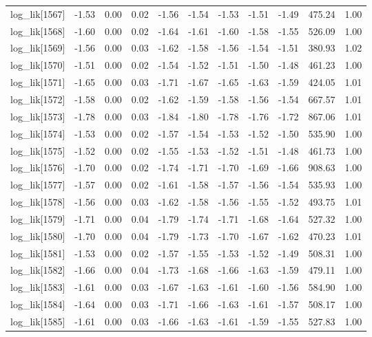 \begin{table}[ht]
\begin{tabular}{rrrrrrrrrrr}
  log\_lik[1567] & -1.53 & 0.00 & 0.02 & -1.56 & -1.54 & -1.53 & -1.51 & -1.49 & 475.24 & 1.00 \\ 
  log\_lik[1568] & -1.60 & 0.00 & 0.02 & -1.64 & -1.61 & -1.60 & -1.58 & -1.55 & 526.09 & 1.00 \\ 
  log\_lik[1569] & -1.56 & 0.00 & 0.03 & -1.62 & -1.58 & -1.56 & -1.54 & -1.51 & 380.93 & 1.02 \\ 
  log\_lik[1570] & -1.51 & 0.00 & 0.02 & -1.54 & -1.52 & -1.51 & -1.50 & -1.48 & 461.23 & 1.00 \\ 
  log\_lik[1571] & -1.65 & 0.00 & 0.03 & -1.71 & -1.67 & -1.65 & -1.63 & -1.59 & 424.05 & 1.01 \\ 
  log\_lik[1572] & -1.58 & 0.00 & 0.02 & -1.62 & -1.59 & -1.58 & -1.56 & -1.54 & 667.57 & 1.01 \\ 
  log\_lik[1573] & -1.78 & 0.00 & 0.03 & -1.84 & -1.80 & -1.78 & -1.76 & -1.72 & 867.06 & 1.01 \\ 
  log\_lik[1574] & -1.53 & 0.00 & 0.02 & -1.57 & -1.54 & -1.53 & -1.52 & -1.50 & 535.90 & 1.00 \\ 
  log\_lik[1575] & -1.52 & 0.00 & 0.02 & -1.55 & -1.53 & -1.52 & -1.51 & -1.48 & 461.73 & 1.00 \\ 
  log\_lik[1576] & -1.70 & 0.00 & 0.02 & -1.74 & -1.71 & -1.70 & -1.69 & -1.66 & 908.63 & 1.00 \\ 
  log\_lik[1577] & -1.57 & 0.00 & 0.02 & -1.61 & -1.58 & -1.57 & -1.56 & -1.54 & 535.93 & 1.00 \\ 
  log\_lik[1578] & -1.56 & 0.00 & 0.03 & -1.62 & -1.58 & -1.56 & -1.55 & -1.52 & 493.75 & 1.01 \\ 
  log\_lik[1579] & -1.71 & 0.00 & 0.04 & -1.79 & -1.74 & -1.71 & -1.68 & -1.64 & 527.32 & 1.00 \\ 
  log\_lik[1580] & -1.70 & 0.00 & 0.04 & -1.79 & -1.73 & -1.70 & -1.67 & -1.62 & 470.23 & 1.01 \\ 
  log\_lik[1581] & -1.53 & 0.00 & 0.02 & -1.57 & -1.55 & -1.53 & -1.52 & -1.49 & 508.31 & 1.00 \\ 
  log\_lik[1582] & -1.66 & 0.00 & 0.04 & -1.73 & -1.68 & -1.66 & -1.63 & -1.59 & 479.11 & 1.00 \\ 
  log\_lik[1583] & -1.61 & 0.00 & 0.03 & -1.67 & -1.63 & -1.61 & -1.60 & -1.56 & 584.90 & 1.00 \\ 
  log\_lik[1584] & -1.64 & 0.00 & 0.03 & -1.71 & -1.66 & -1.63 & -1.61 & -1.57 & 508.17 & 1.00 \\ 
  log\_lik[1585] & -1.61 & 0.00 & 0.03 & -1.66 & -1.63 & -1.61 & -1.59 & -1.55 & 527.83 & 1.00 \\ 

\end{tabular}
\end{table}
